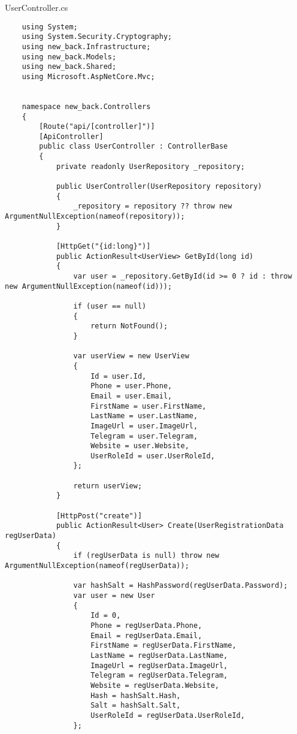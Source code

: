 UserController.cs
\lstset{style=sharpc}
\begin{lstlisting}
    using System;
    using System.Security.Cryptography;
    using new_back.Infrastructure;
    using new_back.Models;
    using new_back.Shared;
    using Microsoft.AspNetCore.Mvc;
    
    
    namespace new_back.Controllers
    {
        [Route("api/[controller]")]
        [ApiController]
        public class UserController : ControllerBase
        {
            private readonly UserRepository _repository;
            
            public UserController(UserRepository repository)
            {
                _repository = repository ?? throw new ArgumentNullException(nameof(repository));
            }
            
            [HttpGet("{id:long}")]
            public ActionResult<UserView> GetById(long id)
            {
                var user = _repository.GetById(id >= 0 ? id : throw new ArgumentNullException(nameof(id)));
                
                if (user == null)
                {
                    return NotFound();
                }
                
                var userView = new UserView
                {
                    Id = user.Id,
                    Phone = user.Phone,
                    Email = user.Email,
                    FirstName = user.FirstName,
                    LastName = user.LastName,
                    ImageUrl = user.ImageUrl,
                    Telegram = user.Telegram,
                    Website = user.Website,
                    UserRoleId = user.UserRoleId,
                };
                
                return userView;
            }
            
            [HttpPost("create")]
            public ActionResult<User> Create(UserRegistrationData regUserData)
            {
                if (regUserData is null) throw new ArgumentNullException(nameof(regUserData));
    
                var hashSalt = HashPassword(regUserData.Password);
                var user = new User
                {
                    Id = 0,
                    Phone = regUserData.Phone,
                    Email = regUserData.Email,
                    FirstName = regUserData.FirstName,
                    LastName = regUserData.LastName,
                    ImageUrl = regUserData.ImageUrl,
                    Telegram = regUserData.Telegram,
                    Website = regUserData.Website,
                    Hash = hashSalt.Hash,
                    Salt = hashSalt.Salt,
                    UserRoleId = regUserData.UserRoleId,
                };
    

\end{lstlisting}
